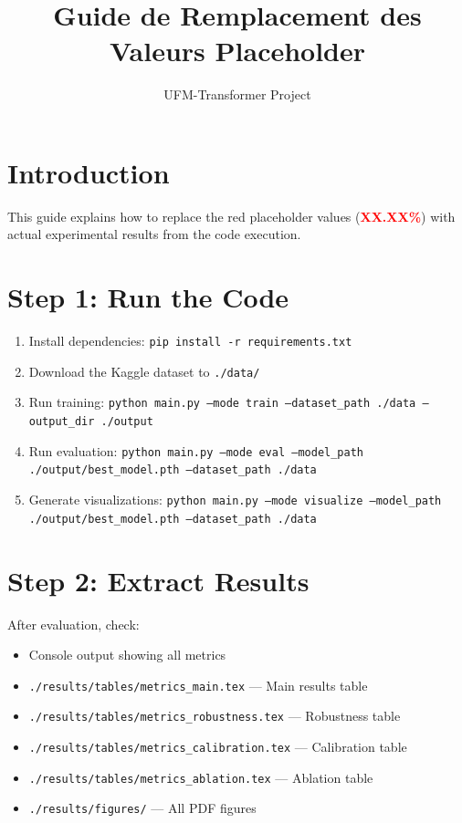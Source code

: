 \documentclass[11pt,a4paper]{article}
\begin{document}
\title{Guide de Remplacement des Valeurs Placeholder}
\author{UFM-Transformer Project}
\maketitle

\section{Introduction}
This guide explains how to replace the red placeholder values (\textcolor{red}{\textbf{XX.XX\%}}) 
with actual experimental results from the code execution.

\section{Step 1: Run the Code}
\begin{enumerate}
\item Install dependencies: \texttt{pip install -r requirements.txt}
\item Download the Kaggle dataset to \texttt{./data/}
\item Run training: \texttt{python main.py --mode train --dataset\_path ./data --output\_dir ./output}
\item Run evaluation: \texttt{python main.py --mode eval --model\_path ./output/best\_model.pth --dataset\_path ./data}
\item Generate visualizations: \texttt{python main.py --mode visualize --model\_path ./output/best\_model.pth --dataset\_path ./data}
\end{enumerate}

\section{Step 2: Extract Results}
After evaluation, check:
\begin{itemize}
\item Console output showing all metrics
\item \texttt{./results/tables/metrics\_main.tex} --- Main results table
\item \texttt{./results/tables/metrics\_robustness.tex} --- Robustness table
\item \texttt{./results/tables/metrics\_calibration.tex} --- Calibration table
\item \texttt{./results/tables/metrics\_ablation.tex} --- Ablation table
\item \texttt{./results/figures/} --- All PDF figures
\end{itemize}
\end{document}
